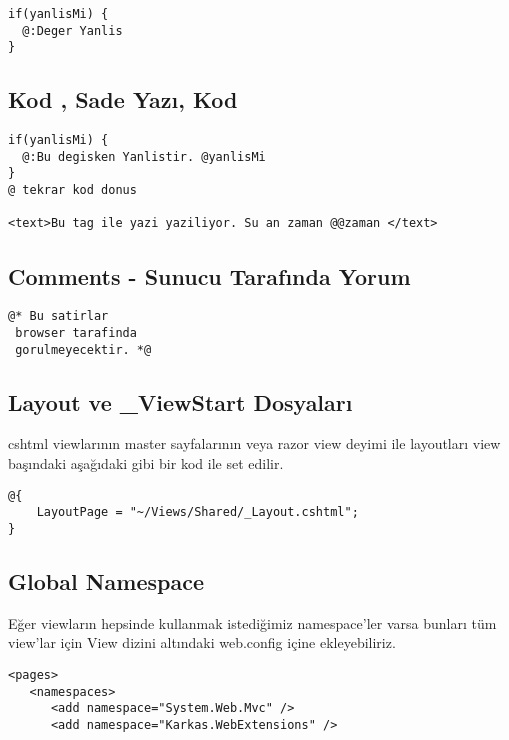 \documentclass[10pt,a4paper]{article}
\begin{document}
\begin{lstlisting}[label=code-TextAndMarkup3,caption=Yazı ve Markup 3 @:]
if(yanlisMi) {
  @:Deger Yanlis
}
\end{lstlisting}





\subsection{Kod , Sade Yazı, Kod}

\begin{lstlisting}[label=code-TextAndMarkup,caption=Yazı ve Markup]
if(yanlisMi) {
  @:Bu degisken Yanlistir. @yanlisMi
}
@ tekrar kod donus

<text>Bu tag ile yazi yaziliyor. Su an zaman @@zaman </text>
\end{lstlisting}


\subsection{Comments - Sunucu Tarafında Yorum}

\begin{lstlisting}[label=code-Comment,caption=Comment - Yorum]
@* Bu satirlar
 browser tarafinda  
 gorulmeyecektir. *@
\end{lstlisting}


\subsection{Layout ve \_ViewStart Dosyaları}
cshtml viewlarının master sayfalarının veya razor view deyimi ile layoutları
view başındaki aşağıdaki gibi bir kod ile set edilir.

\begin{lstlisting}[label=code-Layout,caption=Layout - Düzenleme]
@{
	LayoutPage = "~/Views/Shared/_Layout.cshtml";
}
\end{lstlisting}




\subsection{Global Namespace}
Eğer viewların hepsinde kullanmak istediğimiz namespace'ler varsa bunları tüm view'lar için View dizini altındaki web.config
içine ekleyebiliriz.

\begin{lstlisting}[label=code-GlobalNamespace,caption=Global Namespace Ekleme]
<pages>
   <namespaces>
      <add namespace="System.Web.Mvc" />
      <add namespace="Karkas.WebExtensions" />
\end{lstlisting}
\end{document}
